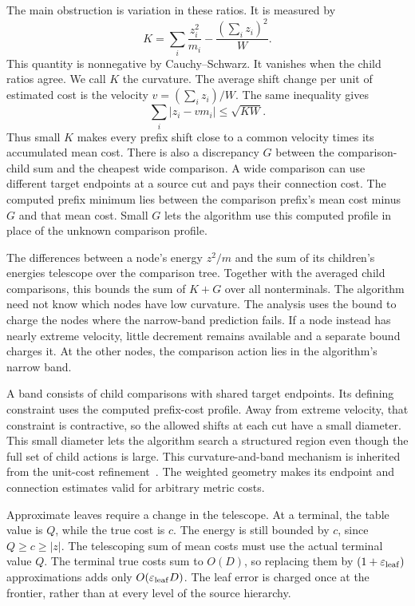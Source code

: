 \documentclass[11pt]{article}
\theoremstyle{definition}
\newcommand{\1}{\mathbf 1}
\begin{document}
The main obstruction is variation in these ratios.
It is measured by
\[
 K=\sum_i\frac{z_i^2}{m_i}
   -\frac{(\sum_i z_i)^2}{W}.
\]
This quantity is nonnegative by Cauchy--Schwarz.
It vanishes when the child ratios agree.
We call $K$ the curvature. The average shift change per unit of
estimated cost is the velocity $v=(\sum_i z_i)/W$.
The same inequality gives
\[
 \sum_i|z_i-vm_i|\le\sqrt{KW}.
\]
Thus small $K$ makes every prefix shift close to a common velocity
times its accumulated mean cost.
There is also a discrepancy $G$ between the comparison-child sum and
the cheapest wide comparison. A wide comparison can use different
target endpoints at a source cut and pays their connection cost.
The computed prefix minimum lies between the comparison prefix's mean
cost minus $G$ and that mean cost.
Small $G$ lets the algorithm use this computed profile in place of the
unknown comparison profile.

The differences between a node's energy $z^2/m$ and the sum of its
children's energies telescope over the comparison tree.
Together with the averaged child comparisons, this bounds the sum of
$K+G$ over all nonterminals.
The algorithm need not know which nodes have low curvature.
The analysis uses the bound to charge the nodes where the narrow-band
prediction fails. If a node instead has nearly extreme velocity,
little decrement remains available and a separate bound charges it.
At the other nodes, the comparison action lies in the algorithm's
narrow band.

A band consists of child comparisons with shared target endpoints.
Its defining constraint uses the computed prefix-cost profile.
Away from extreme velocity, that constraint is contractive, so the
allowed shifts at each cut have a small diameter.
This small diameter lets the algorithm search a structured region even
though the full set of child actions is large.
This curvature-and-band mechanism is inherited from the unit-cost
refinement~\cite{openai}.
The weighted geometry makes its endpoint and connection estimates
valid for arbitrary metric costs.

Approximate leaves require a change in the telescope.
At a terminal, the table value is $Q$, while the true cost is $c$.
The energy is still bounded by $c$, since $Q\ge c\ge|z|$.
The telescoping sum of mean costs must use the actual terminal value
$Q$. The terminal true costs sum to $O(D)$, so replacing them by
$(1+\varepsilon_{\rm leaf})$ approximations adds only
$O(\varepsilon_{\rm leaf}D)$.
The leaf error is charged once at the frontier, rather than at every
level of the source hierarchy.
\end{document}

